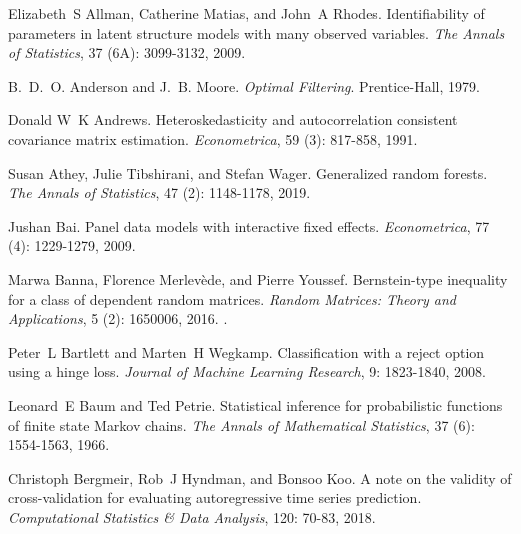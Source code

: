 Elizabeth~S Allman, Catherine Matias, and John~A Rhodes.
\newblock Identifiability of parameters in latent structure models with many observed variables.
\newblock \emph{The Annals of Statistics}, 37 (6A): 3099-3132, 2009.

B.~D.~O. Anderson and J.~B. Moore.
\newblock \emph{Optimal Filtering}.
\newblock Prentice-Hall, 1979.

Donald W~K Andrews.
\newblock Heteroskedasticity and autocorrelation consistent covariance matrix estimation.
\newblock \emph{Econometrica}, 59 (3): 817-858, 1991.

Susan Athey, Julie Tibshirani, and Stefan Wager.
\newblock Generalized random forests.
\newblock \emph{The Annals of Statistics}, 47 (2): 1148-1178, 2019.

Jushan Bai.
\newblock Panel data models with interactive fixed effects.
\newblock \emph{Econometrica}, 77 (4): 1229-1279, 2009.

Marwa Banna, Florence Merlev{\`e}de, and Pierre Youssef.
\newblock Bernstein-type inequality for a class of dependent random matrices.
\newblock \emph{Random Matrices: Theory and Applications}, 5 (2): 1650006, 2016.
\newblock {}.

Peter~L Bartlett and Marten~H Wegkamp.
\newblock Classification with a reject option using a hinge loss.
\newblock \emph{Journal of Machine Learning Research}, 9: 1823-1840, 2008.

Leonard~E Baum and Ted Petrie.
\newblock Statistical inference for probabilistic functions of finite state {M}arkov chains.
\newblock \emph{The Annals of Mathematical Statistics}, 37 (6): 1554-1563, 1966.

Christoph Bergmeir, Rob~J Hyndman, and Bonsoo Koo.
\newblock A note on the validity of cross-validation for evaluating autoregressive time series prediction.
\newblock \emph{Computational Statistics \& Data Analysis}, 120: 70-83, 2018.

